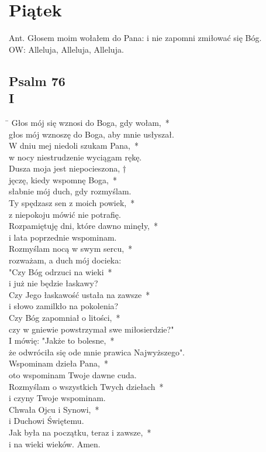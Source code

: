 \section*{Piątek}
Ant. Głosem moim wołałem do Pana: i nie zapomni zmiłować się Bóg.\\
OW: Alleluja, Alleluja, Alleluja.
\subsection*{Psalm 76\\I}
\begin{tabbing}
\hspace{4mm} \= \>\kill
Głos mój się wznosi do Boga, gdy wołam,~*\\
głos mój wznoszę do Boga, aby mnie usłyszał.\\
\>W dniu mej niedoli szukam Pana,~*\\
\>w nocy niestrudzenie wyciągam rękę.\\
Dusza moja jest niepocieszona, †\\
jęczę, kiedy wspomnę Boga,~*\\
słabnie mój duch, gdy rozmyślam.\\
\>Ty spędzasz sen z moich powiek,~*\\
\>z niepokoju mówić nie potrafię.\\
Rozpamiętuję dni, które dawno minęły,~*\\
i lata poprzednie wspominam.\\
\>Rozmyślam nocą w swym sercu,~*\\
\>rozważam, a duch mój docieka:\\
"Czy Bóg odrzuci na wieki~*\\
i już nie będzie łaskawy?\\
\>Czy Jego łaskawość ustała na zawsze~*\\
\>i słowo zamilkło na pokolenia?\\
Czy Bóg zapomniał o litości,~*\\
czy w gniewie powstrzymał swe miłosierdzie?"\\
\>I mówię: "Jakże to bolesne,~*\\
\>że odwróciła się ode mnie prawica Najwyższego".\\
Wspominam dzieła Pana,~*\\
oto wspominam Twoje dawne cuda.\\
\>Rozmyślam o wszystkich Twych dziełach~*\\
\>i czyny Twoje wspominam.\\
Chwała Ojcu i Synowi,~*\\
i Duchowi Świętemu.\\
\>Jak była na początku, teraz i zawsze,~*\\
\>i na wieki wieków. Amen.
\end{tabbing}

